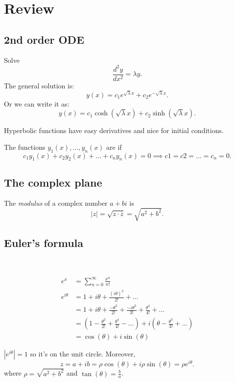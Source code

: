 \documentclass[class=article,crop=false]{standalone}
\begin{document}
\section{Review}
\subsection{2nd order ODE}
\begin{eg}[]
Solve \[
\frac{d^2 y}{d {x }^2} = \lambda y
.\] 
The general solution is:
\[
	y(x) = c_1 e^{\sqrt{\lambda} x} + c_2 e^{-\sqrt{\lambda} x}
.\]
Or we can write it as:
\[
	y(x)= c_1 \cosh(\sqrt{\lambda} x  ) + c_2 \sinh(\sqrt{\lambda} x  )
.\] 
\begin{note}[]
Hyperbolic functions have easy derivatives and nice for initial conditions.
\end{note}
\end{eg}

\begin{defn}
	The functions $y_1(x),\ldots,y_n(x)$ are  if 
	\[
		c_1 y_1(x) + c_2 y_2(x) + \ldots + c_n y_n(x) = 0 \implies c1=c2=\ldots=c_n=0
	.\] 
\end{defn}
\subsection{The complex plane}
The \emph{modulus} of a complex number $a+bi$ is
 \[
|z| = \sqrt{z \cdot \overline{z} } = \sqrt{a^2+b^2}  
.\] 
\subsection{Euler's formula}

~\begin{prf}
\begin{align*}
	e^{x} &= \sum_{ n=0}^{\infty} \frac{x^{n}}{n!} \\
	e^{i\theta} &= 1 + i\theta + \frac{(i\theta)^2}{2!} + \ldots\\
	&= 1 + i\theta + \frac{-\theta^2}{2!} + \frac{-i\theta^3}{3!} + \frac{\theta^{4}}{4!} + \ldots \\
	&= (1-\frac{\theta^2}{2!}+\frac{\theta^{4}}{4!}-\ldots) + i(\theta - \frac{\theta^3}{3!} + \ldots)\\
	&= \cos(\theta ) + i \sin(\theta )
\end{align*}
\end{prf}
\begin{note}[]
$\left| e^{i\theta} \right| = 1$ so it's on the unit circle. Moreover,
\[
	z=a+ib=\rho \cos(\theta ) + i\rho \sin(\theta ) = \rho e^{i\theta}
.\] 
where $\rho=\sqrt{a^2+b^2} $ and $\tan(\theta) = \frac{b}{a}$.
\end{note}
\end{document}
